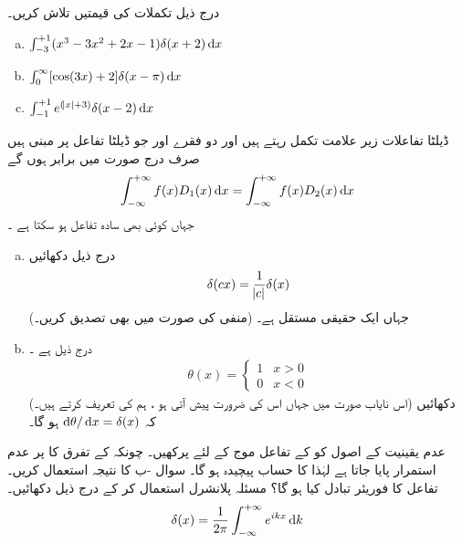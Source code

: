 درج ذیل تکملات کی قیمتیں تلاش کریں۔ 
\begin{enumerate}[a.]
\item\(\int_{-3}^{+1}(x^{3}-3x^{2}+2x-1) \delta(x+2) \dif{x}\)
\item\( \int_{0}^{\infty}[\cos(3x)+2] \delta(x-\pi) \dif{x}\)
\item\(\int_{-1}^{+1}e^{(\abs x+3)} \delta (x-2) \dif{x}\)
\end{enumerate}
 ڈیلٹا تفاعلات زیر علامت تکمل رہتے ہیں اور دو فقرے  اور جو ڈیلٹا تفاعل پر مبنی ہیں صرف درج صورت میں  برابر ہوں گے
\begin{align*}
\int_{-\infty}^{+\infty}f(x) D_1(x) \dif x =\int_{-\infty}^{+\infty}f(x) D_2(x) \dif x
\end{align*}
 جہاں  کوئی بھی سادہ تفاعل ہو سکتا ہے ۔
\begin{enumerate}[a.]
\item 
درج ذیل دکھائیں
 \begin{align}\delta(cx)=\frac{1}{\abs{c}}\delta(x)\end{align}
جہاں  ایک حقیقی مستقل ہے۔ (منفی  کی صورت میں بھی تصدیق کریں۔) 
\item 
{} درج ذیل ہے ۔
\begin{align}\label{مساوات_غیر_تابع_شروڈنگر_تھیٹا_سیڑھی_تفاعل}
\theta(x)=
\begin{cases}
1& x>0\\
0& x<0
\end{cases}
\end{align}
 (اس نایاب صورت میں جہاں اس کی ضرورت پیش آتی ہو ، ہم  کی تعریف  کرتے ہیں۔) دکھائیں کہ \(\dif{\theta}/\dif{x}=\delta(x)\) ہو گا۔
\end{enumerate}
 عدم یقینیت کے اصول کو کے تفاعل موج کے لئے پرکھیں۔  چونکہ  کے تفرق کا پر عدم استمرار پایا جاتا ہے لہٰذا کا حساب پیچیدہ ہو گا۔  سوال -ب کا نتیجہ استعمال کریں۔   
 تفاعل  کا فوریئر تبادل کیا ہو گا؟ مسئلہ پلانشرل استعمال کر کے درج ذیل دکھائیں۔ 
\begin{align}\label{مساوات_شروڈنگر_ڈیلٹا_پلانشرال}
\delta(x)=\frac{1}{2\pi}\int_{-\infty}^{+\infty} e^{ikx} \dif{k}
\end{align}
